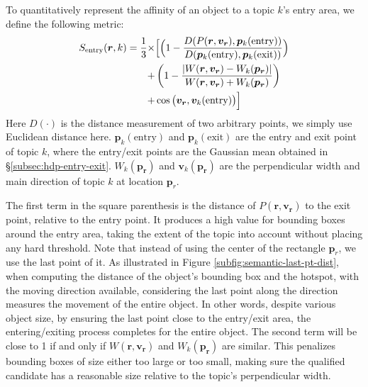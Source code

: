     To quantitatively represent the affinity of an object to a topic $k$'s entry area, we define the following metric:
    \begin{align}
        \begin{split}
        S_\text{entry}(\bm{r}, k) = \frac{1}{3}\times & \Bigl[\Bigl(1-\frac{D(P(\bm{r}, \bm{v_r}), \bm{p}_k(\text{entry}))}{D(\bm{p}_k(\text{entry}), \bm{p}_k(\text{exit}))}\Bigl) \\
        + & \left(1 - \frac{|W(\bm{r}, \bm{v_r}) - W_k(\bm{p_r})|}{W(\bm{r}, \bm{v_r}) + W_k(\bm{p_r})}\right) \\
        + & \cos\big(\bm{v_r}, \bm{v}_k(\text{entry})\big)\Bigl]\label{eq:entry_score}
        \end{split}
    \end{align}
    Here $D(\cdot)$ is the distance measurement of two arbitrary points, we simply use Euclidean distance here. 
    $\bm{p}_k(\text{entry})$ and $\bm{p}_k(\text{exit})$ are the entry and exit point of topic $k$, where the entry/exit points are the Gaussian mean obtained in \S\ref{subsec:hdp-entry-exit}. 
    $W_k(\bm{p_r})$ and $\bm{v}_k(\bm{p_r})$ are the perpendicular width and main direction of topic $k$ at location $\bm{p}_{r}$.
    
    The first term in the square parenthesis is the distance of $P(\bm{r}, \bm{v_r})$ to the exit point, relative to the entry point. It produces a high value for bounding boxes around the entry area, taking the extent of the topic into account without placing any hard threshold. 
    Note that instead of using the center of the rectangle $\bm{p}_{r}$, we use the last point of it. 
    As illustrated in Figure \ref{subfig:semantic-last-pt-dist}, when computing the distance of the object's bounding box and the hotspot, with the moving direction available, considering the last point along the direction measures the movement of the entire object. In other words, despite various object size, by ensuring the last point close to the entry/exit area, the entering/exiting process completes for the entire object.
    The second term will be close to 1 if and only if $W(\bm{r}, \bm{v_r})$ and $W_k(\bm{p_r})$ are similar.
    This penalizes bounding boxes of size either too large or too small, making sure the qualified candidate has a reasonable size relative to the topic's perpendicular width. 




